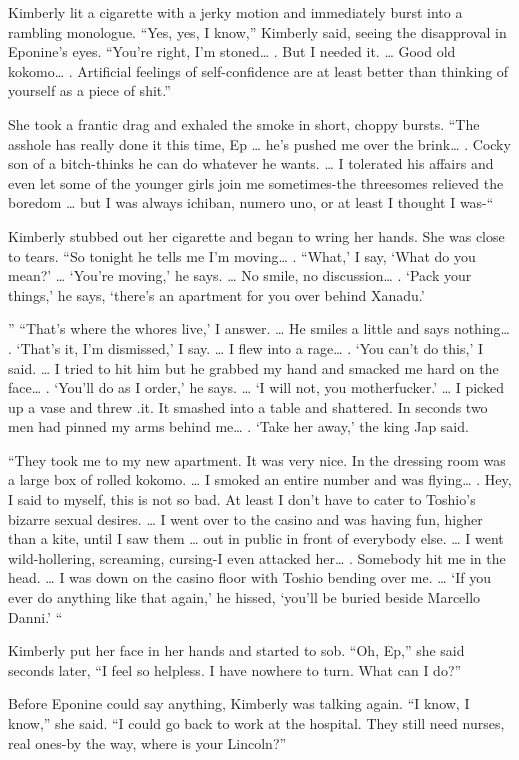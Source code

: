 \documentclass[]{article}
\begin{document}
{Kimberly lit a cigarette with a jerky motion and immediately burst into a rambling monologue. “Yes, yes, I know,” Kimberly said, seeing the disapproval in Eponine’s eyes. “You’re right, I’m stoned… . But I needed it. … Good old kokomo… . Artificial feelings of self-confidence are at least better than thinking of yourself as a piece of shit.”

She took a frantic drag and exhaled the smoke in short, choppy bursts. “The asshole has really done it this time, Ep … he’s pushed me over the brink… . Cocky son of a bitch-thinks he can do whatever he wants. … I tolerated his affairs and even let some of the younger girls join me sometimes-the threesomes relieved the boredom … but I was always ichiban, numero uno, or at least I thought I was-“

Kimberly stubbed out her cigarette and began to wring her hands. She was close to tears. “So tonight he tells me I’m moving… . “What,’ I say, ‘What do you mean?’ … ‘You’re moving,’ he says. … No smile, no discussion… . ‘Pack your things,’ he says, ‘there’s an apartment for you over behind Xanadu.’

” “That’s where the whores live,’ I answer. … He smiles a little and says nothing… . ‘That’s it, I’m dismissed,’ I say. … I flew into a rage… . ‘You can’t do this,’ I said. … I tried to hit him but he grabbed my hand and smacked me hard on the face… . ‘You’ll do as I order,’ he says. … ‘I will not, you motherfucker.’ … I picked up a vase and threw .it. It smashed into a table and shattered. In seconds two men had pinned my arms behind me… . ‘Take her away,’ the king Jap said.

“They took me to my new apartment. It was very nice. In the dressing room was a large box of rolled kokomo. … I smoked an entire number and was flying… . Hey, I said to myself, this is not so bad. At least I don’t have to cater to Toshio’s bizarre sexual desires. … I went over to the casino and was having fun, higher than a kite, until I saw them … out in public in front of everybody else. … I went wild-hollering, screaming, cursing-I even attacked her… . Somebody hit me in the head. … I was down on the casino floor with Toshio bending over me. … ‘If you ever do anything like that again,’ he hissed, ‘you’ll be buried beside Marcello Danni.’ “

Kimberly put her face in her hands and started to sob. “Oh, Ep,” she said seconds later, “I feel so helpless. I have nowhere to turn. What can I do?”

Before Eponine could say anything, Kimberly was talking again. “I know, I know,” she said. “I could go back to work at the hospital. They still need nurses, real ones-by the way, where is your Lincoln?”

}
\end{document}
